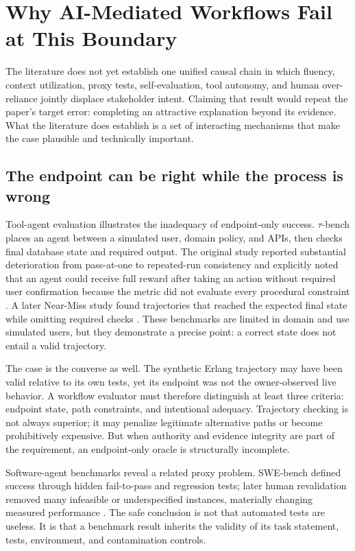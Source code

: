 \documentclass[10pt,a4paper]{article}
\begin{document}
\section{Why AI-Mediated Workflows Fail at This Boundary}

The literature does not yet establish one unified causal chain in which fluency, context utilization, proxy tests, self-evaluation, tool autonomy, and human over-reliance jointly displace stakeholder intent. Claiming that result would repeat the paper's target error: completing an attractive explanation beyond its evidence. What the literature does establish is a set of interacting mechanisms that make the case plausible and technically important.

\subsection{The endpoint can be right while the process is wrong}

Tool-agent evaluation illustrates the inadequacy of endpoint-only success. $\tau$-bench places an agent between a simulated user, domain policy, and APIs, then checks final database state and required output. The original study reported substantial deterioration from pass-at-one to repeated-run consistency and explicitly noted that an agent could receive full reward after taking an action without required user confirmation because the metric did not evaluate every procedural constraint \cite{taubench}. A later Near-Miss study found trajectories that reached the expected final state while omitting required checks \cite{nearmiss2026}. These benchmarks are limited in domain and use simulated users, but they demonstrate a precise point: a correct state does not entail a valid trajectory.

The case is the converse as well. The synthetic Erlang trajectory may have been valid relative to its own tests, yet its endpoint was not the owner-observed live behavior. A workflow evaluator must therefore distinguish at least three criteria: endpoint state, path constraints, and intentional adequacy. Trajectory checking is not always superior; it may penalize legitimate alternative paths or become prohibitively expensive. But when authority and evidence integrity are part of the requirement, an endpoint-only oracle is structurally incomplete.

Software-agent benchmarks reveal a related proxy problem. SWE-bench defined success through hidden fail-to-pass and regression tests; later human revalidation removed many infeasible or underspecified instances, materially changing measured performance \cite{swebench,sweverified}. The safe conclusion is not that automated tests are useless. It is that a benchmark result inherits the validity of its task statement, tests, environment, and contamination controls.
\end{document}
